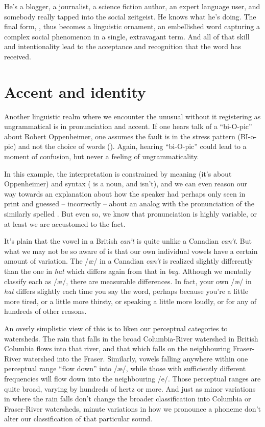 He's a blogger, a journalist, a science fiction author, an expert language user, and somebody really tapped into the social zeitgeist. He knows what he's doing. The final form, , thus becomes a linguistic ornament, an embellished word capturing a complex social phenomenon in a single, extravagant term. And all of that skill and intentionality lead to the acceptance and recognition that the word has received.


\section{Accent and identity}

Another linguistic realm where we encounter the unusual without it registering as ungrammatical is in pronunciation and accent. If one hears talk of a \enquote{bi-O-pic} about Robert Oppenheimer, one assumes the fault is in the stress pattern (BI-o-pic) and not the choice of words (). Again, hearing \enquote{bi-O-pic} could lead to a moment of confusion, but never a feeling of ungrammaticality.

In this example, the interpretation is constrained by meaning (it's about Oppenheimer) and syntax ( is a noun, and  isn't), and we can even reason our way towards an explanation about how the speaker had perhaps only seen  in print and guessed -- incorrectly -- about an analog with the pronunciation of the similarly spelled . But even so, we know that pronunciation is highly variable, or at least we are accustomed to the fact.

It's plain that the vowel in a British \textit{can't} is quite unlike a Canadian \textit{can't}. But what we may not be so aware of is that our own individual vowels have a certain amount of variation. The /æ/ in a Canadian \textit{can't} is realized slightly differently than the one in \textit{hat} which differs again from that in \textit{bag}. Although we mentally classify each as /æ/, there are measurable differences. In fact, your own /æ/ in \textit{hat} differs slightly each time you say the word, perhaps because you're a little more tired, or a little more thirsty, or speaking a little more loudly, or for any of hundreds of other reasons.

An overly simplistic view of this is to liken our perceptual categories to watersheds. The rain that falls in the broad Columbia-River watershed in British Columbia flows into that river, and that which falls on the neighbouring Fraser-River watershed into the Fraser. Similarly, vowels falling anywhere within one perceptual range \enquote{flow down} into /æ/, while those with sufficiently different frequencies will flow down into the neighbouring /e/. Those perceptual ranges are quite broad, varying by hundreds of hertz or more. And just as minor variations in where the rain falls don't change the broader classification into Columbia or Fraser-River watersheds,  minute variations in how we pronounce a phoneme don't alter our classification of that particular sound.

